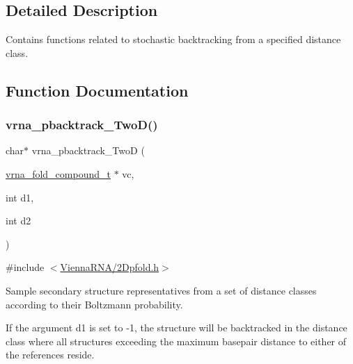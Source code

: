 \subsection{Detailed Description}
Contains functions related to stochastic backtracking from a specified distance class. 



\subsection{Function Documentation}
\mbox{\label{group__kl__neighborhood__stochbt_ga14aceef73f83bbde77bb3a0ca06c9d13}} 
\subsubsection{\texorpdfstring{vrna\+\_\+pbacktrack\+\_\+\+Two\+D()}{vrna\_pbacktrack\_TwoD()}}
{\footnotesize\ttfamily char$\ast$ vrna\+\_\+pbacktrack\+\_\+\+TwoD (\begin{DoxyParamCaption}\item[{\hyperlink{group__fold__compound_ga1b0cef17fd40466cef5968eaeeff6166}{vrna\+\_\+fold\+\_\+compound\+\_\+t} $\ast$}]{vc,  }\item[{int}]{d1,  }\item[{int}]{d2 }\end{DoxyParamCaption})}



{\ttfamily \#include $<$\hyperlink{2Dpfold_8h}{Vienna\+R\+N\+A/2\+Dpfold.\+h}$>$}



Sample secondary structure representatives from a set of distance classes according to their Boltzmann probability. 

If the argument \textquotesingle{}d1\textquotesingle{} is set to \textquotesingle{}-\/1\textquotesingle{}, the structure will be backtracked in the distance class where all structures exceeding the maximum basepair distance to either of the references reside.

